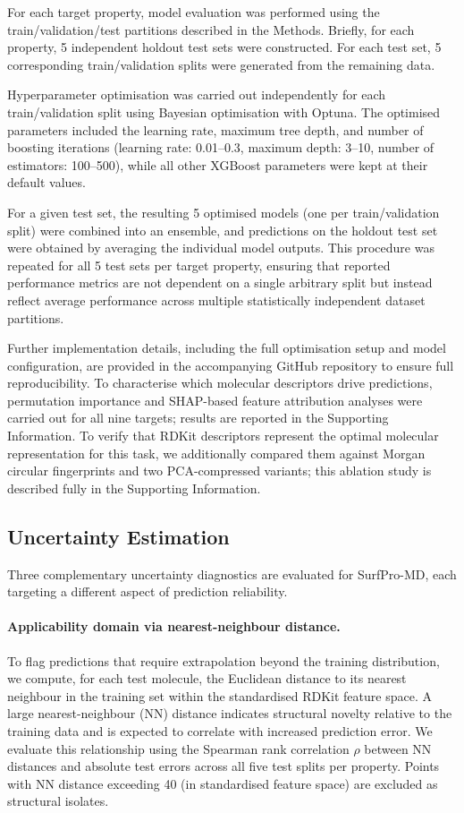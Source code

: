 \documentclass[11pt]{aime}
\begin{document}
For each target property, model evaluation was performed using the train/validation/test partitions described in the Methods.
Briefly, for each property, 5 independent holdout test sets were constructed.
For each test set, 5 corresponding train/validation splits were generated from the remaining data.

Hyperparameter optimisation was carried out independently for each train/validation split using Bayesian optimisation with Optuna.\cite{optuna_2019} The optimised parameters included the learning rate, maximum tree depth, and number of boosting iterations (learning rate: 0.01--0.3, maximum depth: 3--10, number of estimators: 100--500), while all other XGBoost parameters were kept at their default values.

For a given test set, the resulting 5 optimised models (one per train/validation split) were combined into an ensemble, and predictions on the holdout test set were obtained by averaging the individual model outputs.
This procedure was repeated for all 5 test sets per target property, ensuring that reported performance metrics are not dependent on a single arbitrary split but instead reflect average performance across multiple statistically independent dataset partitions.

Further implementation details, including the full optimisation setup and model configuration, are provided in the accompanying GitHub repository to ensure full reproducibility.
To characterise which molecular descriptors drive predictions, permutation importance and SHAP-based feature attribution analyses were carried out for all nine targets;
results are reported in the Supporting Information.
To verify that RDKit descriptors represent the optimal molecular representation for this task, we additionally compared them against Morgan circular fingerprints and two PCA-compressed variants;
this ablation study is described fully in the Supporting Information.


\subsection{Uncertainty Estimation}
\label{sec:methods:uncertainty}

Three complementary uncertainty diagnostics are evaluated for SurfPro-MD, each targeting a different aspect of prediction reliability.

\paragraph{Applicability domain via nearest-neighbour distance.}
To flag predictions that require extrapolation beyond the training distribution, we compute, for each test molecule, the Euclidean distance to its nearest neighbour in the training set within the standardised RDKit feature space.
A large nearest-neighbour (NN) distance indicates structural novelty relative to the training data and is expected to correlate with increased prediction error.
We evaluate this relationship using the Spearman rank correlation $\rho$ between NN distances and absolute test errors across all five test splits per property.
Points with NN distance exceeding 40 (in standardised feature space) are excluded as structural isolates.
\end{document}
